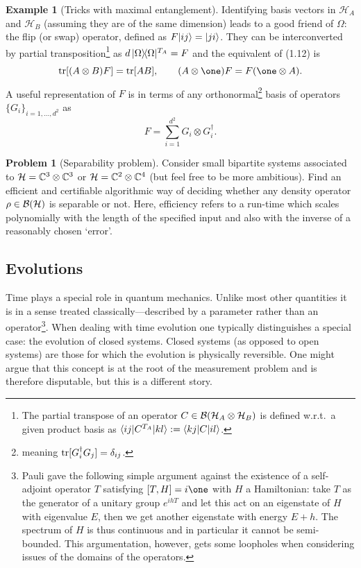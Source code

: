 \documentclass[11pt,a4paper]{article}
\theoremstyle{plain}
\theoremstyle{definition}
\newtheorem{example}{Example}[section]
\newtheorem{problem}{Problem}
\theoremstyle{remark}
\numberwithin{equation}{section}
\begin{document}
\begin{example}[Tricks with maximal entanglement]
    Identifying basis vectors in $\mathcal{H}_A$ and $\mathcal{H}_B$ (assuming they are of the same dimension) leads to a good friend of $\Omega$: the flip (or swap) operator, defined as $F|ij\rangle=|ji\rangle$. They can be interconverted by partial transposition\footnote{The partial transpose of an operator $C\in \mathcal{B}(\mathcal{H}_A\otimes \mathcal{H}_B)$ is defined w.r.t.\ a given product basis as $\langle ij|C^{T_A}|kl\rangle:=\langle kj|C|il\rangle$.} as $d\,|\Omega\rangle\!\langle\Omega|^{T_A}=F$ and the equivalent of (1.12) is
    \begin{equation}
        \tr[(A\otimes B)F]=\tr[AB],
        \qquad
        (A\otimes \one)F = F(\one\otimes A).
    \end{equation}
    A useful representation of $F$ is in terms of any orthonormal\footnote{meaning $\operatorname{tr}[G_i^\dagger G_j]=\delta_{ij}$.} basis of operators $\{G_i\}_{i=1,\dots,d^2}$ as
    \begin{equation}
        F=\sum_{i=1}^{d^2} G_i\otimes G_i^\dagger.
    \end{equation}
\end{example}

\begin{problem}[Separability problem]
Consider small bipartite systems associated to $\mathcal{H}=\mathbb{C}^3\otimes \mathbb{C}^3$ or $\mathcal{H}=\mathbb{C}^2\otimes \mathbb{C}^4$ (but feel free to be more ambitious). Find an efficient and certifiable algorithmic way of deciding whether any density operator $\rho\in \mathcal{B}(\mathcal{H})$ is separable or not. Here, efficiency refers to a run-time which scales polynomially with the length of the specified input and also with the inverse of a reasonably chosen `error'.
\end{problem}

\subsection{Evolutions}

Time plays a special role in quantum mechanics. Unlike most other quantities it is in a sense treated classically---described by a parameter rather than an operator\footnote{Pauli gave the following simple argument against the existence of a self-adjoint operator $T$ satisfying $[T,H]=i\one$ with $H$ a Hamiltonian: take $T$ as the generator of a unitary group $e^{ihT}$ and let this act on an eigenstate of $H$ with eigenvalue $E$, then we get another eigenstate with energy $E+h$. The spectrum of $H$ is thus continuous and in particular it cannot be semi-bounded. This argumentation, however, gets some loopholes when considering issues of the domains of the operators.}. When dealing with time evolution one typically distinguishes a special case: the evolution of closed systems. Closed systems (as opposed to open systems) are those for which the evolution is physically reversible. One might argue that this concept is at the root of the measurement problem and is therefore disputable, but this is a different story.
\end{document}
